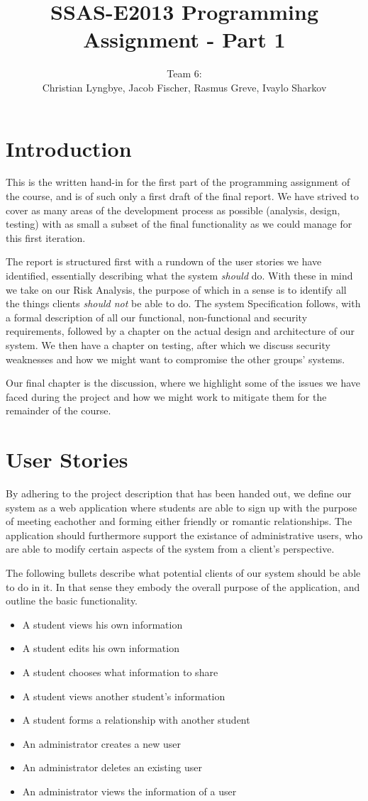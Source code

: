 \documentclass[a4paper]{article}
\title{SSAS-E2013 Programming Assignment - Part 1}
\author{Team 6:\\Christian Lyngbye, Jacob Fischer, Rasmus Greve, Ivaylo Sharkov}
\begin{document}
\maketitle

\section{Introduction}
This is the written hand-in for the first part of the programming assignment of the course, and is of such only a first draft of the final report. We have strived to cover as many areas of the development process as possible (analysis, design, testing) with as small a subset of the final functionality as we could manage for this first iteration.

The report is structured first with a rundown of the user stories we have identified, essentially describing what the system \emph{should} do. With these in mind we take on our Risk Analysis, the purpose of which in a sense is to identify all the things clients \emph{should not} be able to do. The system Specification follows, with a formal description of all our functional, non-functional and security requirements, followed by a chapter on the actual design and architecture of our system. We then have a chapter on testing, after which we discuss security weaknesses and how we might want to compromise the other groups' systems.

Our final chapter is the discussion, where we highlight some of the issues we have faced during the project and how we might work to mitigate them for the remainder of the course.

\section{User Stories}
By adhering to the project description that has been handed out, we define our system as a web application where students are able to sign up with the purpose of meeting eachother and forming either friendly or romantic relationships. The application should furthermore support the existance of administrative users, who are able to modify certain aspects of the system from a client's perspective.

The following bullets describe what potential clients of our system should be able to do in it. In that sense they embody the overall purpose of the application, and outline the basic functionality.
\begin{itemize}
\item A student views his own information
\item A student edits his own information
\item A student chooses what information to share
\item A student views another student’s information
\item A student forms a relationship with another student
\item An administrator creates a new user
\item An administrator deletes an existing user
\item An administrator views the information of a user
\end{itemize}
\end{document}
